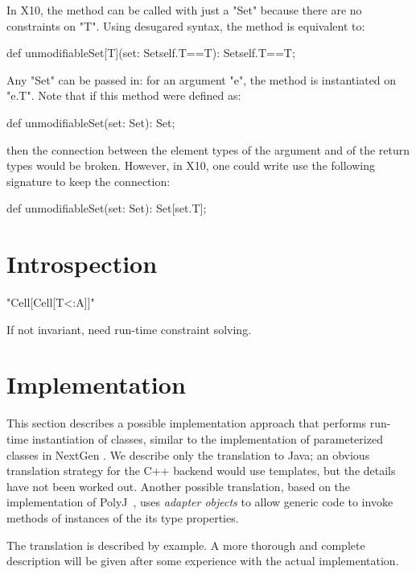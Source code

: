 \documentclass{llncs}
\newif\ifsemantics
\begin{document}
In X10, the method can be called with just a \xcd"Set" because there
are no constraints on \xcd"T".  Using desugared syntax, the method is
equivalent to: 
\begin{xten}
def unmodifiableSet[T](set: Set{self.T==T}): Set{self.T==T};
\end{xten}
Any \xcd"Set" can be passed in: for an argument \xcd"e", the method
is instantiated on \xcd"e.T".
%
Note that if this method were defined as:
\begin{xten}
def unmodifiableSet(set: Set): Set;
\end{xten}
then the connection between the element types of the
argument and of the return types would be broken.
However, in X10, one could write use the following signature to keep the
connection:
\begin{xten}
def unmodifiableSet(set: Set): Set[set.T];
\end{xten}

\section{Introspection}

\xcd"Cell[Cell[T<:A]]"

If not invariant, need run-time constraint solving.
\fi

\ifsemantics

\section{Semantics}


\fi

\section{Implementation}

This section describes a possible implementation approach that
performs
run-time instantiation of classes, similar to the implementation
of parameterized classes in NextGen \cite{allen03,allen04}.
We describe only the translation to Java; an obvious
translation strategy for the C++ backend would use templates,
but the details have not been worked out.
Another possible translation, 
based on the implementation of PolyJ~\cite{polyj},
uses \emph{adapter objects} to allow generic code to invoke
methods of instances of the its type properties.

The translation is described by example.  A more thorough and complete
description will be given after some experience with the actual
implementation.
\end{document}
